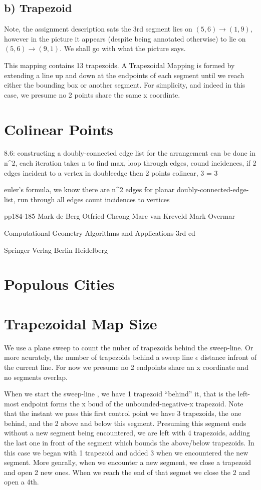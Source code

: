 \documentclass{article}
\begin{document}
\subsection{b) Trapezoid}
Note, the assignment description sats the 3rd segment lies on $(5,6) \rightarrow (1,9)$, however in the picture it appears (despite being annotated otherwise) to lie on $(5,6) \rightarrow (9,1)$.
We shall go with what the picture says.

This mapping contains 13 trapezoids.
A Trapezoidal Mapping is formed by extending a line up and down at the endpoints of each segment until we reach either the bounding box or another segment.
For simplicity, and indeed in this case, we presume no 2 points share the same x coordinte.

\section {Colinear Points}

8.6: constructing a doubly-connected edge list for the arrangement can be done in n^2, each iteration takes n
to find max, loop through edges, cound incidences, if 2 edges incident to a vertex in doubleedge then 2 points colinear, 3 = 3

euler's formula, we know there are n^2 edges for planar doubly-connected-edge-list, run through all edges count incidences to vertices

pp184-185
Mark de Berg
Otfried Cheong
Marc van Kreveld
Mark Overmar

Computational Geometry
Algorithms and Applications
3rd ed

Springer-Verlag Berlin Heidelberg

\section {Populous Cities}

\section {Trapezoidal Map Size}

We use a plane sweep to count the nuber of trapezoids behind the sweep-line.
Or more acurately, the number of trapezoids behind a sweep line $\epsilon$ distance infront of the current line.
For now we presume no 2 endpoints share an x coordinate and no segments overlap.

When we start the sweep-line , we have 1 trapezoid ``behind'' it, that is the left-most endpoint forms the x boud of the unbounded-negative-x trapezoid.
Note that the instant we pass this first control point we have 3 trapezoids, the one behind, and the 2 above and below this segment.
Presuming this segment ends without a new segment being encountered, we are left with 4 trapezoids, adding the last one in front of the segment which bounds the above/below trapezoids.
In this case we began with 1 trapezoid and added 3 when we encountered the new segment.
More genrally, when we encounter a new segment, we close a trapezoid and open 2 new ones.
When we reach the end of that segmet we close the 2 and open a 4th.
\end{document}
